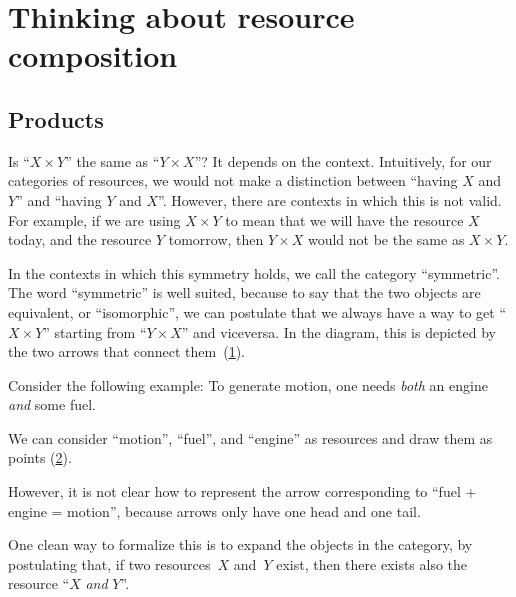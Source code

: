 \section{Thinking about resource composition}
\subsection{Products}
Is ``$X \times Y$'' the same as ``$Y \times X$''?
It depends on the context. Intuitively, for our categories of resources, we would not make a distinction
between ``having $X$ and $Y$'' and ``having $Y$ and $X$''.
However, there are contexts in which this is not valid. For example, if we are
using $X \times Y$ to mean that we will have the resource $X$ today, and the
resource $Y$ tomorrow, then $Y \times X$ would not be the same as $X \times Y$.

In the contexts in which this symmetry holds, we call the category ``symmetric''.
The word ``symmetric'' is well suited, because to say that the two objects are equivalent,
or ``isomorphic'', we can postulate that we always have a way to get
``$X \times Y$'' starting from ``$Y \times X$'' and viceversa. In the diagram, this is depicted
by the two arrows that connect them~(\cref{fig:e17}).

\begin{figure}[h!]
    \centering
    \caption{\label{fig:e17}}
\end{figure}

Consider the following example: To generate motion, one needs \emph{both} an engine \emph{and} some fuel.

We can consider ``motion'', ``fuel'', and ``engine'' as resources and draw them as points (\cref{fig:e11}).

\begin{figure}[h!]
    \centering
    \caption{\label{fig:e11}}
\end{figure}

However, it is not clear how to represent the arrow corresponding to
``fuel + engine = motion'', because arrows only have one head and
one tail.

One clean way to formalize this is to expand the objects in the category,
by postulating that,
if two resources~$X$ and~$Y$ exist, then there exists also the
resource ``$X$ \emph{and} $Y$''.


